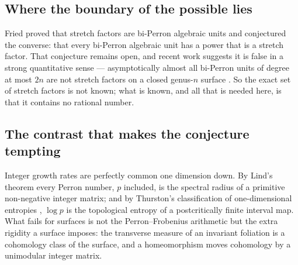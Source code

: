 \documentclass[11pt]{article}
\theoremstyle{plain}
\theoremstyle{definition}
\theoremstyle{remark}
\begin{document}
\subsection{Where the boundary of the possible lies}

Fried \cite{Fried} proved that stretch factors are bi-Perron algebraic units and
conjectured the converse: that every bi-Perron algebraic unit has a power that is a
stretch factor. That conjecture remains open, and recent work suggests it is
false in a strong quantitative sense --- asymptotically almost all bi-Perron units
of degree at most $2n$ are not stretch factors on a closed genus-$n$ surface
\cite{BRW}. So the exact set of stretch factors is not known; what is known, and
all that is needed here, is that it contains no rational number.

\subsection{The contrast that makes the conjecture tempting}

Integer growth rates are perfectly common one dimension down. By Lind's theorem
\cite{Lind} every Perron number, $p$ included, is the spectral radius of a
primitive non-negative integer matrix; and by Thurston's classification of
one-dimensional entropies \cite{ThurstonEntropy}, $\log p$ is the topological
entropy of a postcritically finite interval map. What fails for surfaces is not the
Perron--Frobenius arithmetic but the extra rigidity a surface imposes: the
transverse measure of an invariant foliation is a cohomology class of the surface,
and a homeomorphism moves cohomology by a unimodular integer matrix.
\end{document}
